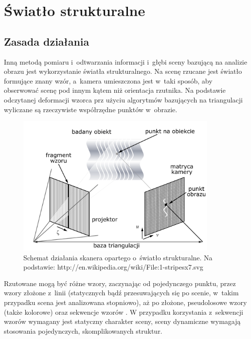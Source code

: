 \section{Światło strukturalne}

\subsection{Zasada działania}

Inną metodą pomiaru i~odtwarzania informacji i~głębi sceny bazującą na analizie
obrazu jest wykorzystanie światła strukturalnego. Na scenę rzucane jest światło
formujące znany wzór, a~kamera umieszczona jest w~taki sposób, aby obserwować
scenę pod innym kątem niż orientacja rzutnika. Na podstawie odczytanej deformacji
wzorca prz użyciu algorytmów bazujących na triangulacji wyliczane są rzeczywiste
współrzędne punktów w~obrazie.

\begin{figure}[htb!]
\centering
\includegraphics[width=10cm]{../../Common/img/struct}
\caption[Schemat działania skanera opartego o~światło strukturalne]
{Schemat działania skanera opartego o~światło strukturalne. Na podstawie:
http://en.wikipedia.org/wiki/File:1-stripesx7.svg}
\label{fig:struct_principle}
\end{figure}

Rzutowane mogą być różne wzory, zaczynając od pojedynczego punktu, przez
wzory złożone z~linii (statycznych bądź przesuwających się po
scenie, w~takim przypadku scena jest analizowana stopniowo), aż po złożone,
pseudolosowe wzory (także kolorowe) oraz sekwencje wzorów \cite{1588327}. W
przypadku korzystania z~sekwencji wzorów wymagany jest statyczny charakter
sceny, sceny dynamiczne wymagają stosowania pojedynczych, skomplikowanych
struktur.

